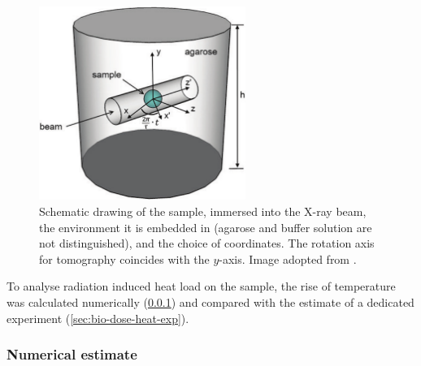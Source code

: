 \documentclass[
twoside,
openright,
titlepage,
numbers=noenddot,
headinclude,
fleqn,
a4paper,
footinclude=true,
cleardoublepage=empty,
abstractoff,
BCOR=5mm,
paper=a4,
fontsize=11pt,
british,ngerman,american,
]{scrreprt}
\begin{document}
\begin{figure}
  \centering
  \includegraphics[width=0.6\textwidth]
  {figures/HeatLoad/SampleAndBeam.png}
  \caption[Schematic drawing of a sample immersed into  X-ray beam
  for numerical heat load computation.]{Schematic drawing of the
    sample, immersed into the X-ray beam, the environment it is
    embedded in (agarose and buffer solution are not distinguished),
    and the choice of coordinates.  The rotation axis for tomography
    coincides with the $y$-axis.  Image adopted from
    \cite{Moosmann2013nature}.}
  \label{fig:sample-beam}
\end{figure}

To analyse radiation induced heat load on the sample, the rise of
temperature was calculated numerically (\cref{sec:bio-dose-heat-sim})
and compared with the estimate of a dedicated experiment
(\cref{sec:bio-dose-heat-exp}).

\subsubsection{Numerical estimate}
\label{sec:bio-dose-heat-sim}
\end{document}
